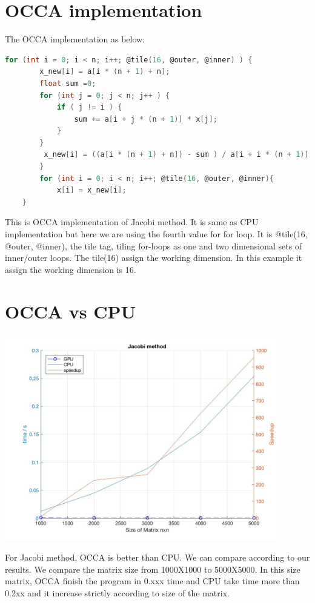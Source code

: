 \section{OCCA implementation}
The OCCA implementation as below:
\begin{lstlisting}[language=C, caption=Jacobi method in OCCA]
	for (int i = 0; i < n; i++; @tile(16, @outer, @inner) ) {
		x_new[i] = a[i * (n + 1) + n];
		float sum =0;
		for (int j = 0; j < n; j++ ) {
			if ( j != i ) {
				sum += a[i + j * (n + 1)] * x[j];
            }
        }
         x_new[i] = ((a[i * (n + 1) + n]) - sum ) / a[i + i * (n + 1)];
        }
        for (int i = 0; i < n; i++; @tile(16, @outer, @inner){
    		x[i] = x_new[i];
    }
\end{lstlisting}
This is OCCA implementation of Jacobi method. It is same as CPU implementation but here we are using the fourth value for for loop. It is @tile(16, @outer, @inner), the tile tag, tiling for-loops as one and two dimensional sets of inner/outer loops. The tile(16) assign the working dimension. In this example it assign the working dimension is 16. 
\section{OCCA vs CPU}
\begin{center}
	\includegraphics[width = 12cm]{Chapters/jacobi_method.jpg}
\end{center}

For Jacobi method, OCCA is better than CPU. We can compare according to our results. We compare the matrix size from 1000X1000 to 5000X5000. In this size matrix, OCCA finish the program in 0.xxx time and CPU take time more than 0.2xx and it increase strictly according to size of the matrix. 